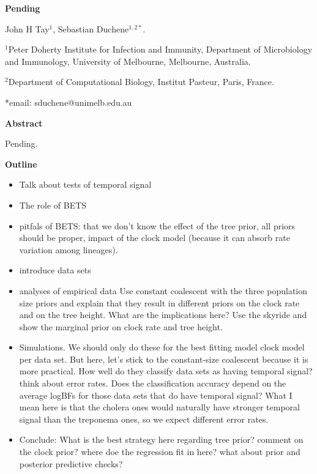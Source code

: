 \documentclass[11pt]{article}
\begin{document}
\begin{flushright}
\end{flushright}
\begin{center}
	\begin{LARGE}
		\textbf{Pending}
	\end{LARGE}
	
	John H Tay$^1$, Sebastian Duchene$^{1, 2*}$.

$^1$Peter Doherty Institute for Infection and Immunity, Department of Microbiology and Immunology, University of Melbourne, Melbourne, Australia.

$^2$Department of Computational Biology, Institut Pasteur, Paris, France.

\end{center}
*email: sduchene@unimelb.edu.au


\begin{Large}
	\textbf{Abstract} 
\end{Large}

Pending.


\textbf{Outline}
\begin{itemize}
	\item Talk about tests of temporal signal
	\item The role of BETS
	\item pitfals of BETS: that we don't know the effect of the tree prior, all priors should be proper, impact of the clock model (because it can absorb rate variation among lineages).
	\item introduce data sets
	\item analyses of empirical data
	\subitem Use constant coalescent with the three population size priors and explain that they result in different priors on the clock rate and on the tree height. What are the implications here?
	\subitem Use the skyride and show the marginal prior on clock rate and tree height.
	\item Simulations. We should only do these for the best fitting model clock model per data set. But here, let's stick to the constant-size coalescent because it is more practical. 
	\subitem How well do they classify data sets as having temporal signal? think about error rates.
	\subitem Does the classification accuracy depend on the average logBFs for those data sets that do have temporal signal? What I mean here is that the cholera ones would naturally have stronger temporal signal than the treponema ones, so we expect different error rates. 
	\item Conclude: What is the best strategy here regarding tree prior? comment on the clock prior? where doe the regression fit in here? what about prior and posterior predictive checks?
\end{itemize}
\end{document}
